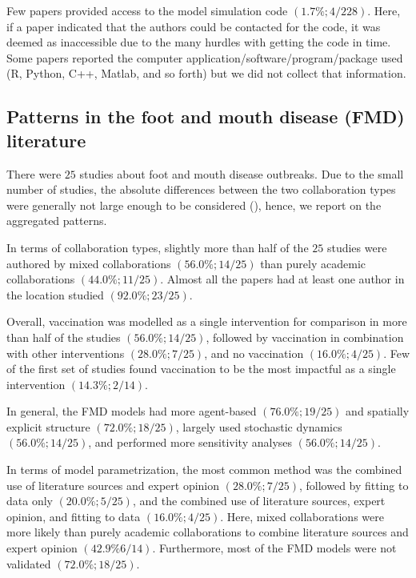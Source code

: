 \documentclass[10pt,letterpaper]{article}
\begin{document}
Few papers provided access to the model simulation code $(1.7\%; 4/228)$. Here, if a paper indicated that the authors could be contacted for the code, it was deemed as inaccessible due to the many hurdles with getting the code in time. Some papers reported the computer application/software/program/package used (R, Python, C++, Matlab, and so forth) but we did not collect that information. 

\subsection*{Patterns in the foot and mouth disease (FMD) literature}
There were $25$ studies about foot and mouth disease outbreaks. Due to the small number of studies, the absolute differences between the two collaboration types were generally not large enough to be considered (), hence, we report on the aggregated patterns. 

In terms of collaboration types, slightly more than half of the $25$ studies were authored by mixed collaborations $(56.0\%; 14/25)$ than purely academic collaborations $(44.0\%; 11/25)$. Almost all the papers had at least one author in the location studied $(92.0\%; 23/25)$. 

Overall, vaccination was modelled as a single intervention for comparison in more than half of the studies $(56.0\%; 14/25)$, followed by vaccination in combination with other interventions $(28.0\%; 7/25)$, and no vaccination $(16.0\%; 4/25)$. Few of the first set of studies found vaccination to be the most impactful as a single intervention $(14.3\%; 2/14)$.  

In general, the FMD models had more agent-based $(76.0\%; 19/25)$ and spatially explicit structure $(72.0\%; 18/25)$, largely used stochastic dynamics $(56.0\%; 14/25)$, and performed more sensitivity analyses $(56.0\%; 14/25)$. 

In terms of model parametrization, the most common method was the combined use of literature sources and expert opinion $(28.0\%; 7/25)$, followed by fitting to data only $(20.0\%; 5/25)$, and the combined use of literature sources, expert opinion, and fitting to data $(16.0\%; 4/25)$. Here, mixed collaborations were more likely than purely academic collaborations to combine literature sources and expert opinion $(42.9\% 6/14)$. Furthermore, most of the FMD models were not validated $(72.0\%; 18/25)$.
\end{document}

